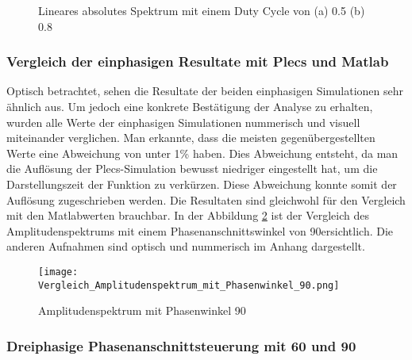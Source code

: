 \begin{figure}[ht!]
	\centering
	\qquad
	\caption{Lineares absolutes Spektrum mit einem Duty Cycle von (a) 0.5 (b) 0.8}
	\label{fig:plecs_Schwingungspakete_absolut log}
\end{figure}

\subsubsection{Vergleich der einphasigen Resultate mit Plecs und Matlab}
Optisch betrachtet, sehen die Resultate der beiden einphasigen Simulationen sehr ähnlich aus. Um jedoch eine konkrete Bestätigung der Analyse zu erhalten, wurden alle Werte der einphasigen Simulationen nummerisch und visuell miteinander verglichen. Man erkannte, dass die meisten gegenübergestellten Werte eine Abweichung von unter 1\% haben. Dies Abweichung entsteht, da man die Auflösung der Plecs-Simulation bewusst niedriger eingestellt hat, um die Darstellungszeit der Funktion zu verkürzen. Diese Abweichung konnte somit der Auflösung zugeschrieben werden. Die Resultaten sind gleichwohl für den Vergleich mit den Matlabwerten brauchbar. In der Abbildung \ref{fig:Amplitudenspektrum mit Phasenwinkel 90grad} ist der Vergleich des Amplitudenspektrums mit einem Phasenanschnittswinkel von 90\textdegree ersichtlich. Die anderen Aufnahmen sind optisch und nummerisch im Anhang dargestellt.


\begin{figure}[ht!]
	\centering
	\texttt{[image: Vergleich\_Amplitudenspektrum\_mit\_Phasenwinkel\_90.png]}	
	\caption{Amplitudenspektrum mit Phasenwinkel 90\textdegree}
	\label{fig:Amplitudenspektrum mit Phasenwinkel 90grad}
\end{figure}


\subsubsection{Dreiphasige Phasenanschnittsteuerung mit 60\textdegree\hspace{0.02cm} und 90\textdegree\hspace{0.02cm}}


